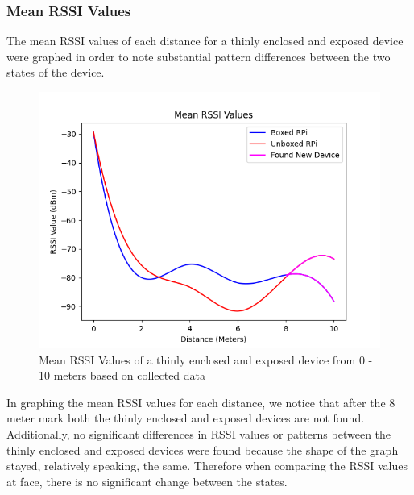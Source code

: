 \documentclass[letterpaper, 10 pt, conference]{ieeeconf}  %
\begin{document}
\subsubsection{Mean RSSI Values}
The mean RSSI values of each distance for a thinly enclosed and exposed device were graphed in order to note substantial pattern differences between the two states of the device.
   \begin{figure}[thpb]
      \centering
      \includegraphics[scale=0.5]{MeanGraph.png}
      \caption{Mean RSSI Values of a thinly enclosed and exposed device from 0 - 10 meters based on collected data}
      \label{figurelabel}
   \end{figure}
\smallbreak
In graphing the mean RSSI values for each distance, we notice that after the 8 meter mark both the thinly enclosed and exposed devices are not found. Additionally, no significant differences in RSSI values or patterns between the thinly enclosed and exposed devices were found because the shape of the graph stayed, relatively speaking, the same. Therefore when comparing the RSSI values at face, there is no significant change between the states.
\end{document}
